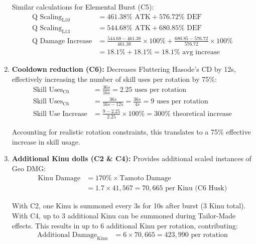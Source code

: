 \documentclass[12pt,a4paper]{article}
\begin{document}
\begin{enumerate}
        Similar calculations for Elemental Burst (C5):
        \begin{align}
        \text{Q Scaling}_{\text{L10}} &= 461.38\% \text{ ATK} + 576.72\% \text{ DEF} \\
        \text{Q Scaling}_{\text{L13}} &= 544.68\% \text{ ATK} + 680.85\% \text{ DEF} \\
        \text{Q Damage Increase} &= \frac{544.68 - 461.38}{461.38} \times 100\% + \frac{680.85 - 576.72}{576.72} \times 100\% \\
        &= 18.1\% + 18.1\% = 18.1\% \text{ avg increase}
        \end{align}
    
    \item \textbf{Cooldown reduction (C6):} Decreases Fluttering Hasode's CD by 12s, effectively increasing the number of skill uses per rotation by 75\%:
        \begin{align}
        \text{Skill Uses}_{\text{C0}} &= \frac{36s}{16s} = 2.25 \text{ uses per rotation} \\
        \text{Skill Uses}_{\text{C6}} &= \frac{36s}{16s-12s} = \frac{36s}{4s} = 9 \text{ uses per rotation} \\
        \text{Skill Use Increase} &= \frac{9 - 2.25}{2.25} \times 100\% = 300\% \text{ theoretical increase}
        \end{align}
        
        Accounting for realistic rotation constraints, this translates to a 75\% effective increase in skill usage.
    
    \item \textbf{Additional Kinu dolls (C2 & C4):} Provides additional scaled instances of Geo DMG:
        \begin{align}
        \text{Kinu Damage} &= 170\% \times \text{Tamoto Damage} \\
        &= 1.7 \times 41,567 = 70,665 \text{ per Kinu (C6 Husk)}
        \end{align}
        
        With C2, one Kinu is summoned every 3s for 10s after burst (3 Kinu total). With C4, up to 3 additional Kinu can be summoned during Tailor-Made effects. This results in up to 6 additional Kinu per rotation, contributing:
        \begin{align}
        \text{Additional Damage}_{\text{Kinu}} &= 6 \times 70,665 = 423,990 \text{ per rotation}
        \end{align}
\end{enumerate}
\end{document}
